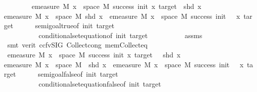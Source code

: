 \begin{isabellebody}
\ \ \isamarkupfalse%
\isanewline
\ \ \isamarkupfalse%
\ \isamarkupfalse%
\ {\isachardoublequoteopen}emeasure\ M\ {\isacharbraceleft}{\kern0pt}x\ {\isasymin}\ space\ M{\isachardot}{\kern0pt}\ success\ init\ x\ target\ {\isasymand}\ shd\ x{\isacharbraceright}{\kern0pt}\ {\isacharequal}{\kern0pt}\ \isanewline
emeasure\ M\ {\isacharbraceleft}{\kern0pt}x\ {\isasymin}\ space\ M{\isachardot}{\kern0pt}\ shd\ x{\isacharbraceright}{\kern0pt}\ {\isacharasterisk}{\kern0pt}\ emeasure\ M\ {\isacharbraceleft}{\kern0pt}x\ {\isasymin}\ space\ M{\isachardot}{\kern0pt}\ success\ {\isacharparenleft}{\kern0pt}init\ {\isacharplus}{\kern0pt}\ {}{\isacharparenright}{\kern0pt}\ x\ target{\isacharbraceright}{\kern0pt}{\isachardoublequoteclose}\isanewline
\ \ \ \ \isamarkupfalse%
\ semi{\isacharunderscore}{\kern0pt}goal{\isacharunderscore}{\kern0pt}true{\isacharbrackleft}{\kern0pt}of\ init\ target{\isacharbrackright}{\kern0pt}\isanewline
\ \ \ \ \ \ \ \ \ \ conditional{\isacharunderscore}{\kern0pt}set{\isacharunderscore}{\kern0pt}equation{\isacharbrackleft}{\kern0pt}of\ init\ target{\isacharbrackright}{\kern0pt}\isanewline
\ \ \ \ \ \ \ \ \ \ assms\isanewline
\ \ \ \ \isamarkupfalse%
\ {\isacharparenleft}{\kern0pt}smt\ {\isacharparenleft}{\kern0pt}verit{\isacharcomma}{\kern0pt}\ ccfv{\isacharunderscore}{\kern0pt}SIG{\isacharparenright}{\kern0pt}\ Collect{\isacharunderscore}{\kern0pt}cong\ mem{\isacharunderscore}{\kern0pt}Collect{\isacharunderscore}{\kern0pt}eq{\isacharparenright}{\kern0pt}\isanewline
\ \ \isamarkupfalse%
\ \isamarkupfalse%
\ {\isachardoublequoteopen}emeasure\ M\ {\isacharbraceleft}{\kern0pt}x\ {\isasymin}\ space\ M{\isachardot}{\kern0pt}\ success\ init\ x\ target\ {\isasymand}\ {\isasymnot}\ shd\ x{\isacharbraceright}{\kern0pt}\ {\isacharequal}{\kern0pt}\ \isanewline
emeasure\ M\ {\isacharbraceleft}{\kern0pt}x\ {\isasymin}\ space\ M{\isachardot}{\kern0pt}\ {\isasymnot}\ shd\ x{\isacharbraceright}{\kern0pt}\ {\isacharasterisk}{\kern0pt}\ emeasure\ M\ {\isacharbraceleft}{\kern0pt}x\ {\isasymin}\ space\ M{\isachardot}{\kern0pt}\ success\ {\isacharparenleft}{\kern0pt}init\ {\isacharminus}{\kern0pt}\ {}{\isacharparenright}{\kern0pt}\ x\ target{\isacharbraceright}{\kern0pt}{\isachardoublequoteclose}\isanewline
\ \ \ \ \isamarkupfalse%
\ semi{\isacharunderscore}{\kern0pt}goal{\isacharunderscore}{\kern0pt}false{\isacharbrackleft}{\kern0pt}of\ init\ target{\isacharbrackright}{\kern0pt}\isanewline
\ \ \ \ \ \ \ \ \ \ conditional{\isacharunderscore}{\kern0pt}set{\isacharunderscore}{\kern0pt}equation{\isacharunderscore}{\kern0pt}false{\isacharbrackleft}{\kern0pt}of\ init\ target{\isacharbrackright}{\kern0pt}\isanewline

\end{isabellebody}
